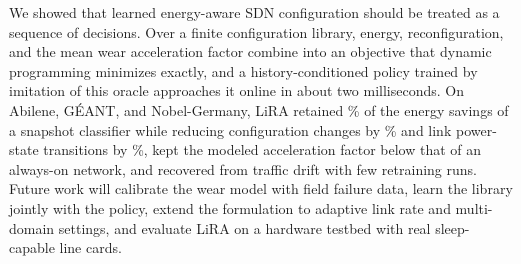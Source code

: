 \documentclass[conference]{IEEEtran}
\begin{document}
We showed that learned energy-aware SDN configuration should be treated as a sequence of decisions. Over a finite configuration library, energy, reconfiguration, and the mean wear acceleration factor combine into an objective that dynamic programming minimizes exactly, and a history-conditioned policy trained by imitation of this oracle approaches it online in about two milliseconds. On Abilene, G\'{E}ANT, and Nobel-Germany, LiRA retained \resRetention\% of the energy savings of a snapshot classifier while reducing configuration changes by \resChangeRed\% and link power-state transitions by \resTransRed\%, kept the modeled acceleration factor below that of an always-on network, and recovered from traffic drift with few retraining runs. Future work will calibrate the wear model with field failure data, learn the library jointly with the policy, extend the formulation to adaptive link rate and multi-domain settings, and evaluate LiRA on a hardware testbed with real sleep-capable line cards.



\end{document}
